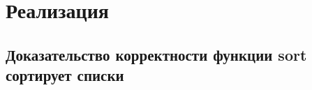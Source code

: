 \section{Реализация}


\subsection{Доказательство корректности функции sort сортирует списки}\label{sortProof}

\cite{ncat:tt-ct}


\subsection{}
